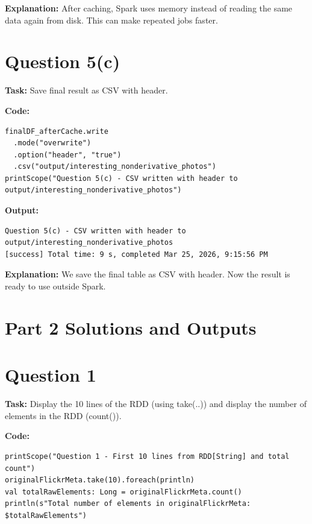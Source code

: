 \documentclass[11pt]{article}
\begin{document}
\textbf{Explanation:} After caching, Spark uses memory instead of reading the same data again from disk. This can make repeated jobs faster.

\section*{Question 5(c)}
\textbf{Task:} Save final result as CSV with header.

\textbf{Code:}
\begin{lstlisting}
finalDF_afterCache.write
  .mode("overwrite")
  .option("header", "true")
  .csv("output/interesting_nonderivative_photos")
printScope("Question 5(c) - CSV written with header to output/interesting_nonderivative_photos")
\end{lstlisting}

\textbf{Output:}
\begin{lstlisting}
Question 5(c) - CSV written with header to output/interesting_nonderivative_photos
[success] Total time: 9 s, completed Mar 25, 2026, 9:15:56 PM
\end{lstlisting}

\textbf{Explanation:} We save the final table as CSV with header. Now the result is ready to use outside Spark.

\section*{Part 2 Solutions and Outputs}

\section*{Question 1}
\textbf{Task:} Display the 10 lines of the RDD (using take(..)) and display the number of elements in the RDD (count()).

\textbf{Code:}
\begin{lstlisting}
printScope("Question 1 - First 10 lines from RDD[String] and total count")
originalFlickrMeta.take(10).foreach(println)
val totalRawElements: Long = originalFlickrMeta.count()
println(s"Total number of elements in originalFlickrMeta: $totalRawElements")
\end{lstlisting}
\end{document}
